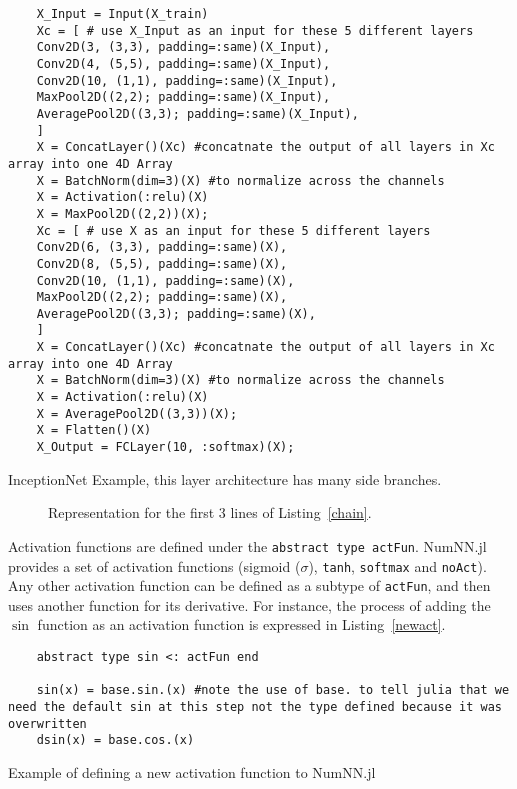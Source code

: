 \begin{listing}[!h]
	\begin{verbatim}
	X_Input = Input(X_train)
	Xc = [ # use X_Input as an input for these 5 different layers
	Conv2D(3, (3,3), padding=:same)(X_Input),
	Conv2D(4, (5,5), padding=:same)(X_Input),
	Conv2D(10, (1,1), padding=:same)(X_Input),
	MaxPool2D((2,2); padding=:same)(X_Input),
	AveragePool2D((3,3); padding=:same)(X_Input),
	]
	X = ConcatLayer()(Xc) #concatnate the output of all layers in Xc array into one 4D Array
	X = BatchNorm(dim=3)(X) #to normalize across the channels
	X = Activation(:relu)(X)
	X = MaxPool2D((2,2))(X);
	Xc = [ # use X as an input for these 5 different layers
	Conv2D(6, (3,3), padding=:same)(X),
	Conv2D(8, (5,5), padding=:same)(X),
	Conv2D(10, (1,1), padding=:same)(X),
	MaxPool2D((2,2); padding=:same)(X),
	AveragePool2D((3,3); padding=:same)(X),
	]
	X = ConcatLayer()(Xc) #concatnate the output of all layers in Xc array into one 4D Array
	X = BatchNorm(dim=3)(X) #to normalize across the channels
	X = Activation(:relu)(X)
	X = AveragePool2D((3,3))(X);
	X = Flatten()(X)
	X_Output = FCLayer(10, :softmax)(X);
	\end{verbatim}
	\caption{InceptionNet Example, this layer architecture has many side branches.}\label{chain}
\end{listing}

\begin{figure}[!h]
	\centering
	
	\caption{Representation for the first 3 lines of Listing~\ref{chain}.}\label{fig:inc}
\end{figure}

Activation functions are defined under the \texttt{abstract type actFun}. NumNN.jl provides a set of activation functions (sigmoid ($\sigma$), \texttt{tanh}, \texttt{softmax} and \texttt{noAct}). Any other activation function can be defined as a subtype of \texttt{actFun}, and then uses another function for its derivative. For instance, the process of adding the $\sin$ function as an activation function is expressed in Listing~\ref{newact}.

\begin{listing}[!ht]
	\begin{verbatim}
	abstract type sin <: actFun end
	
	sin(x) = base.sin.(x) #note the use of base. to tell julia that we need the default sin at this step not the type defined because it was overwritten
	dsin(x) = base.cos.(x)
	\end{verbatim}
	\caption{Example of defining a new activation function to NumNN.jl}\label{newact}
\end{listing}

